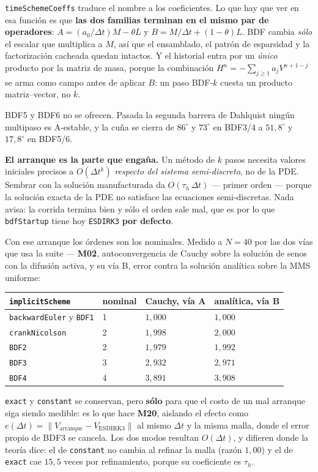\documentclass[11pt,a4paper]{article}
\begin{document}
\texttt{timeSchemeCoeffs} traduce el nombre a los coeficientes. Lo que hay que
ver en esa función es que \textbf{las dos familias terminan en el mismo par de
operadores}: $A=(a_0/\Delta t)M-\theta L$ y $B=M/\Delta t+(1-\theta)L$. BDF
cambia \emph{sólo} el escalar que multiplica a $M$, así que el ensamblado, el
patrón de esparsidad y la factorización cacheada quedan intactos. Y el historial
entra por un \emph{único} producto por la matriz de masa, porque la combinación
$H^n=-\sum_{j\ge1}a_jV^{n+1-j}$ se arma como campo antes de aplicar $B$: un paso
BDF-$k$ cuesta un producto matriz--vector, no $k$.

BDF5 y BDF6 no se ofrecen. Pasada la segunda barrera de Dahlquist ningún
multipaso es A-estable, y la cuña se cierra de $86^\circ$ y $73^\circ$ en BDF3/4
a $51{,}8^\circ$ y $17{,}8^\circ$ en BDF5/6.

\textbf{El arranque es la parte que engaña.} Un método de $k$ pasos necesita
valores iniciales precisos a $O(\Delta t^k)$ \emph{respecto del sistema
semi-discreto}, no de la PDE. Sembrar con la solución manufacturada da
$O(\tau_h\,\Delta t)$ --- primer orden --- porque la solución exacta de la PDE
no satisface las ecuaciones semi-discretas. Nada avisa: la corrida termina bien y
sólo el orden sale mal, que es por lo que \texttt{bdfStartup} tiene hoy
\texttt{ESDIRK3} \textbf{por defecto}.

Con ese arranque los órdenes son los nominales. Medido a $N=40$ por las dos vías
que usa la suite --- \textbf{M02}, autoconvergencia de Cauchy sobre la solución
de senos con la difusión activa, y su vía B, error contra la solución
analítica sobre la MMS uniforme:

\begin{center}
\begin{tabular}{@{}llll@{}}
\toprule
\texttt{implicitScheme} & nominal & Cauchy, vía A & analítica, vía B \\
\midrule
\texttt{backwardEuler} y \texttt{BDF1} & 1 & $1{,}000$ & $1{,}000$ \\
\texttt{crankNicolson} & 2 & $1{,}998$ & $2{,}000$ \\
\texttt{BDF2} & 2 & $1{,}979$ & $1{,}992$ \\
\texttt{BDF3} & 3 & $2{,}932$ & $2{,}971$ \\
\texttt{BDF4} & 4 & $3{,}891$ & $3{,}908$ \\
\bottomrule
\end{tabular}
\end{center}

\texttt{exact} y \texttt{constant} se conservan, pero \textbf{sólo} para que el
costo de un mal arranque siga siendo medible: es lo que hace \textbf{M20},
aislando el efecto como
$e(\Delta t)=\|V_{\text{arranque}}-V_{\text{ESDIRK3}}\|$ al mismo $\Delta t$ y la
misma malla, donde el error propio de BDF3 se cancela. Los dos modos resultan
$O(\Delta t)$, y difieren donde la teoría dice: el de \texttt{constant} no cambia
al refinar la malla (razón $1{,}00$) y el de \texttt{exact} cae $15{,}5$ veces
por refinamiento, porque su coeficiente es $\tau_h$.
\end{document}

